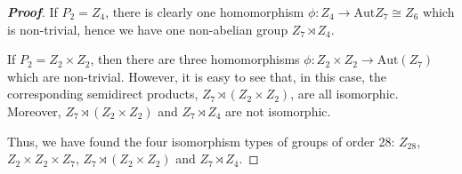 \documentclass[12pt,leqno]{book}
\theoremstyle{definition}
\newenvironment{Proof}{\begin{proof}[\textnormal{\textbf{Proof}}]}{\end{proof}}
\begin{document}
\begin{enumerate}
\begin{Proof}
 If $P_2=Z_4$, there is clearly one homomorphism $\phi:Z_4\to\text{Aut}Z_7\cong Z_6$ which is non-trivial, hence we have one non-abelian group $Z_7\rtimes Z_4$. 

 If $P_2=Z_2\times Z_2$, then there are three homomorphisms $\phi:Z_2\times Z_2\to\text{Aut}(Z_7)$ which are non-trivial. However, it is easy to see that, in this case, the corresponding semidirect products, $Z_7\rtimes(Z_2\times Z_2)$, are all isomorphic. Moreover, $Z_7\rtimes(Z_2\times Z_2)$ and $Z_7\rtimes Z_4$ are not isomorphic. 

 Thus, we have found the four isomorphism types of groups of order 28: $Z_{28}$, $Z_2\times Z_2\times Z_7$, $Z_7\rtimes(Z_2\times Z_2)$ and $Z_7\rtimes Z_4$.
\end{Proof}

\end{enumerate}
\end{document}
